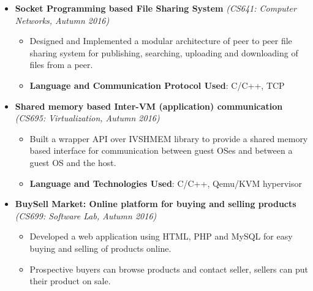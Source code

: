 \documentclass[a4paper,10pt]{article}
\newcommand{\sectsep}{-0.3cm}
\newcommand{\hsep}{-0.6cm}
\begin{document}
\begin{itemize}
    \item \textbf{Socket Programming based File Sharing System} \hfill\emph{(CS641: Computer Networks, Autumn 2016)} \\[\hsep]
        \begin{itemize}
	        \item Designed and Implemented a modular architecture of peer to peer file sharing system for publishing, searching, uploading and downloading of files from a peer. 
            \item \textbf{Language and Communication Protocol Used}: C/C++, TCP 
        \end{itemize}
        \vspace{-0.3cm}


    \item \textbf{Shared memory based Inter-VM (application) communication } \hfill\emph{(CS695: Virtualization, Autumn 2016)}  \\[\hsep]
        \begin{itemize}
	        \item Built a wrapper API over IVSHMEM library to provide a shared memory based interface for communication between guest OSes and between a guest OS and the host.
            \item \textbf{Language and Technologies Used}: C/C++, Qemu/KVM hypervisor 
        \end{itemize}
         \vspace{-0.3cm}
      

    \item \textbf{BuySell Market: Online platform for buying and selling products} \hfill\emph{(CS699: Software Lab, Autumn 2016)}  \\[\hsep]
        \begin{itemize}
	        \item Developed a web application using HTML, PHP and MySQL for easy buying and selling of products online.
            \item Prospective buyers can browse products and contact seller, sellers can put their product on sale. \\[\sectsep] 
        \end{itemize}
         
      

\end{itemize}
\end{document}
